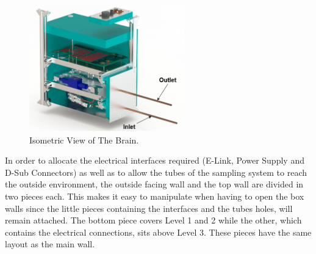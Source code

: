 \begin{figure}[H]
    \centering
    \includegraphics[width=0.6\textwidth]{4-experiment-design/img/Mechanical/Figure_25_0.png}
    \caption{Isometric View of The Brain.}
    \label{brain_isometric}
\end{figure}

\smallskip
In order to allocate the electrical interfaces required (E-Link, Power Supply and D-Sub Connectors) as well as to allow the tubes of the sampling system to reach the outside environment, the outside facing wall and the top wall are divided in two pieces each.  This makes it easy to manipulate when having to open the box walls since the little pieces containing the interfaces and the tubes holes, will remain attached. The bottom piece covers Level 1 and 2 while the other, which contains the electrical connections, sits above Level 3. These pieces have the same layout as the main wall. 












